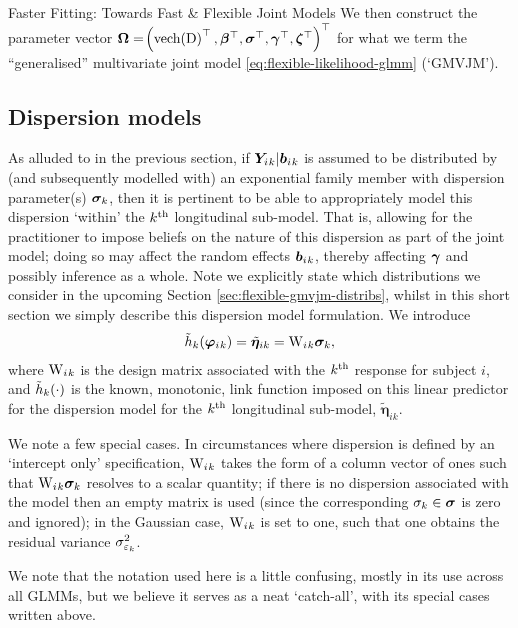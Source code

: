 \begin{chapter}{\label{cha:flexible}Faster Fitting: Towards Fast \& Flexible Joint Models}
We then construct the parameter vector $\bm{\mathrm{\Omega}}=\!\left(\text{vech}\!\left(\mathrm{D}\right)^\top,\bm{\beta}^\top,\bm{\sigma}^\top,\bm{\gamma}^\top,\bm{\zeta}^\top\right)^\top$ for what we term the ``generalised'' multivariate joint model \eqref{eq:flexible-likelihood-glmm} (`GMVJM').

\subsection{Dispersion models}\label{sec:flexible-gmvjm-disp}
As alluded to in the previous section, if $\bm{Y}_i{_k}|\bm{b}_i{_k}$ is assumed to be distributed by (and subsequently modelled with) an exponential family member with dispersion parameter(s) $\bm{\sigma}_k$, then it is pertinent to be able to appropriately model this dispersion `within' the $k^{\text{th}}$ longitudinal sub-model. That is, allowing for the practitioner to impose beliefs on the nature of this dispersion as part of the joint model; doing so may affect the random effects $\bm{b}_i{_k}$, thereby affecting $\bm{\gamma}$ and possibly inference as a whole. Note we explicitly state which distributions we consider in the upcoming Section \ref{sec:flexible-gmvjm-distribs}, whilst in this short section we simply describe this dispersion model formulation. We introduce
\begin{align}
    \tilde{h}_k\!\left(\bm{\varphi}_i{_k}\right)=\tilde{\bm{\eta}}_{ik}=\mathrm{W}_i{_k}\bm{\sigma}_k,
\label{eq:flexible-dispmodel}
\end{align}
where $\mathrm{W}_i{_k}$ is the design matrix associated with the $k^{\text{th}}$ response for subject $i$, and $\tilde{h}_k\!\left(\cdot\right)$ is the known, monotonic, link function imposed on this linear predictor for the dispersion model for the $k^{\text{th}}$ longitudinal sub-model, $\tilde{\bm{\eta}}_{ik}$.

We note a few special cases. In circumstances where dispersion is defined by an `intercept only' specification, $\mathrm{W}_i{_k}$ takes the form of a column vector of ones such that $\mathrm{W}_i{_k}\bm{\sigma}_k$ resolves to a scalar quantity; if there is no dispersion associated with the model then an empty matrix is used (since the corresponding  $\sigma_k\in\bm{\sigma}$ is zero and ignored); in the Gaussian case, $\mathrm{W}_i{_k}$ is set to one, such that one obtains the residual variance $\sigma_{\varepsilon_k}^2$.

We note that the notation used here is a little confusing, mostly in its use across all GLMMs, but we believe it serves as a neat `catch-all', with its special cases written above.


\end{chapter}
